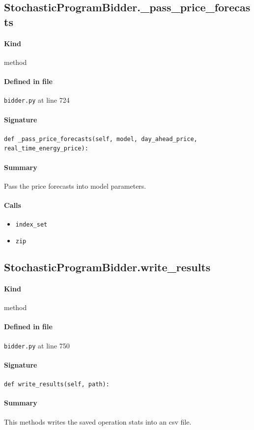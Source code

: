 \documentclass[11pt]{report}
\begin{document}
\subsection{StochasticProgramBidder.\_pass\_price\_forecasts}
\label{def:bidder.py:StochasticProgramBidder._pass_price_forecasts:L724}
\paragraph{Kind} method
\paragraph{Defined in file} \texttt{bidder.py} at line 724
\paragraph{Signature} \texttt{def \_pass\_price\_forecasts(self, model, day\_ahead\_price, real\_time\_energy\_price):}
\paragraph{Summary} Pass the price forecasts into model parameters.
\paragraph{Calls}
\begin{itemize}[leftmargin=*]
  \item \texttt{index\_set}
  \item \texttt{zip}
\end{itemize}
\subsection{StochasticProgramBidder.write\_results}
\label{def:bidder.py:StochasticProgramBidder.write_results:L750}
\paragraph{Kind} method
\paragraph{Defined in file} \texttt{bidder.py} at line 750
\paragraph{Signature} \texttt{def write\_results(self, path):}
\paragraph{Summary} This methods writes the saved operation stats into an csv file.
\end{document}
